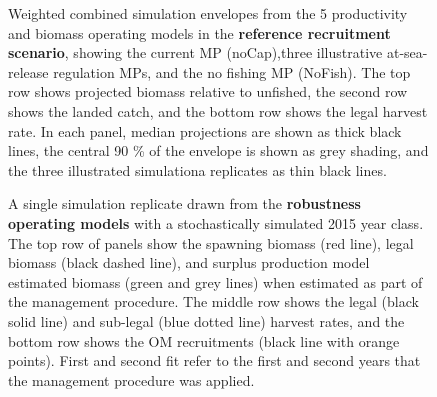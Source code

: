 \documentclass[11pt]{book}
\begin{document}
\begin{landscape}
\begin{figure}[htb]
{}

\caption{Weighted combined simulation envelopes from the 5 productivity and biomass operating models in the \textbf{reference recruitment scenario}, showing the current MP (noCap),three illustrative at-sea-release regulation MPs, and the no fishing MP (NoFish). The top row shows projected biomass relative to unfished, the second row shows the landed catch, and the bottom row shows the legal harvest rate. In each panel, median projections are shown as thick black lines, the central 90 \% of the envelope is shown as grey shading, and the three illustrated simulationa replicates as thin black lines.}\label{fig:unnamed-chunk-24}
\end{figure}
\newpage
\begin{figure}[htb]

{\centering {} 

}

\caption{A single simulation replicate drawn from the \textbf{robustness operating models} with a stochastically simulated 2015 year class. The top row of panels show the spawning biomass (red line), legal biomass (black dashed line), and surplus production model estimated biomass (green and grey lines) when estimated as part of the management procedure. The middle row shows the legal (black solid line) and sub-legal (blue dotted line) harvest rates, and the bottom row shows the OM recruitments (black line with orange points). First and second fit refer to the first and second years that the management procedure was applied.}\label{fig:unnamed-chunk-25}
\end{figure}
\newpage
\begin{figure}[htb]


\end{figure}
\end{landscape}
\end{document}
